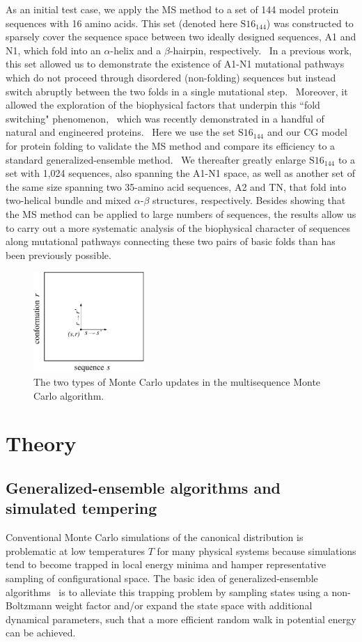 \documentclass[
aip,
rsi,%
amsmath,amssymb,
reprint,%
]{revtex4-1}
\newcommand {\SR}		{${\mathrm{S16}_{144}}$}
\begin{document}
As an initial test case, we apply the MS method to a set of 144 model protein sequences with 16 amino acids. This set (denoted here {\SR}) was constructed to sparsely cover the sequence space between two ideally designed sequences, A1 and N1, which fold into an $\alpha$-helix and a $\beta$-hairpin, respectively.~\cite{Bhattacherjee2012} In a previous work, this set allowed us to demonstrate the existence of A1-N1 mutational pathways which do not proceed through disordered (non-folding) sequences but instead switch abruptly between the two folds in a single mutational step.~\cite{Holzgrafe2014} Moreover, it allowed the exploration of the biophysical factors that underpin this ``fold switching" phenomenon,~\cite{Holzgrafe2015} which was recently demonstrated in a handful of natural and engineered proteins.~\cite{Bryan2010} Here we use the set {\SR} and our CG model for protein folding to validate the MS method and compare its efficiency to a standard generalized-ensemble method.~\cite{Marinari1992,Lyubartsev1992} We thereafter greatly enlarge {\SR} to a set with 1,024 sequences, also spanning the A1-N1 space, as well as another set of the same size spanning two 35-amino acid sequences, A2 and TN, that fold into two-helical bundle and mixed $\alpha$-$\beta$ structures, respectively. Besides showing that the MS method can be applied to large numbers of sequences, the results allow us to carry out a more systematic analysis of the biophysical character of sequences along mutational pathways connecting these two pairs of basic folds than has been previously possible. 

\begin{figure}
\includegraphics[width=4.2cm]{Fig1}
\caption{The two types of Monte Carlo updates in the multisequence Monte Carlo algorithm.}
\end{figure}

\section{Theory}

\subsection{Generalized-ensemble algorithms and simulated tempering}
\noindent
Conventional Monte Carlo simulations of the canonical distribution is problematic at low temperatures $T$ for many physical systems because simulations tend to become trapped in local energy minima and hamper representative sampling of configurational space. The basic idea of generalized-ensemble algorithms~\cite{Mitsutake2001} is to alleviate this trapping problem by sampling states using a non-Boltzmann weight factor and/or expand the state space with additional dynamical parameters, such that a more efficient random walk in potential energy can be achieved. 
\end{document}

